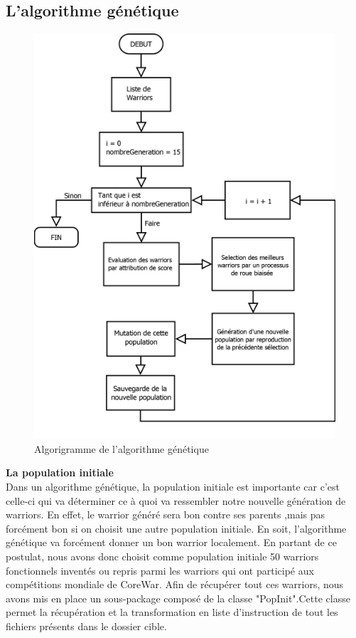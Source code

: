 \documentclass[a4paper,12pt]{article}
\begin{document}
\subsection{L'algorithme génétique}
\begin{center}
\begin{figure}[H]
\includegraphics[scale=0.6]{toma.png}
\caption{Algorigramme de l'algorithme génétique}
\end{figure}
\end{center}
\textbf{La population initiale}\\
Dans un algorithme génétique, la population initiale est importante car c'est celle-ci qui va déterminer ce à quoi va ressembler notre nouvelle génération de warriors. En effet, le warrior généré sera bon contre ses parents ,mais pas forcément bon si on choisit une autre population initiale. En soit, l'algorithme génétique va forcément donner un bon warrior localement. En partant de ce postulat, nous avons donc choisit comme population initiale 50 warriors fonctionnels inventés ou repris parmi les warriors qui ont participé aux compétitions mondiale de CoreWar. Afin de récupérer tout ces warriors, nous avons mis en place un sous-package composé de la classe "PopInit".Cette classe permet la récupération et la transformation en liste d'instruction de tout les fichiers présents dans le dossier cible.
\end{document}
